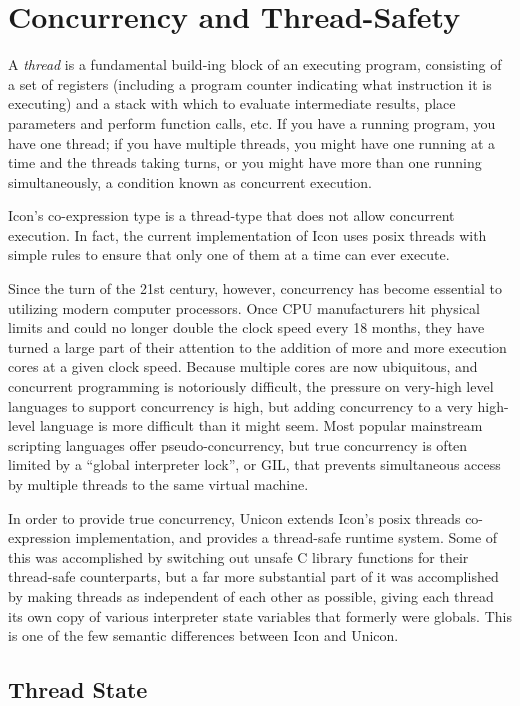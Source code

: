 \chapter{Concurrency and Thread-Safety}

\label{Unicon-Concurrency-Thread_Safety}
A {\em thread\/} is a fundamental build-ing block of an executing
program, consisting of a set of registers (including a program counter
indicating what instruction it is executing) and a stack with which
to evaluate intermediate results, place parameters and perform
function calls, etc.  If you have a running program, you have one
thread; if you have multiple threads, you might have one running at
a time and the threads taking turns, or you might have more than one
running simultaneously, a condition known as concurrent execution.

Icon's co-expression type is a thread-type that does not allow
concurrent execution.  In fact, the current implementation of Icon
uses posix threads with simple rules to ensure that only one of them
at a time can ever execute.

Since the turn of the 21st century, however, concurrency has become
essential to utilizing modern computer processors.  Once CPU
manufacturers hit physical limits and could no longer double the
clock speed every 18 months, they have turned a large part of their
attention to the addition of more and more execution cores at a given
clock speed.  Because multiple cores are now ubiquitous, and
concurrent programming is notoriously difficult, the pressure on
very-high level languages to support concurrency is high, but
adding concurrency to a very high-level language is more difficult
than it might seem.  Most popular mainstream scripting languages
offer pseudo-concurrency, but true concurrency is often limited by
a ``global interpreter lock'', or GIL, that prevents simultaneous
access by multiple threads to the same virtual machine.

In order to provide true concurrency, Unicon extends Icon's posix
threads co-expression implementation, and provides a thread-safe
runtime system.  Some of this was accomplished by switching out unsafe
C library functions for their thread-safe counterparts, but a far more
substantial part of it was accomplished by making threads as
independent of each other as possible, giving each thread its own copy
of various interpreter state variables that formerly were
globals. This is one of the few semantic differences between Icon and
Unicon.

\section{Thread State}

